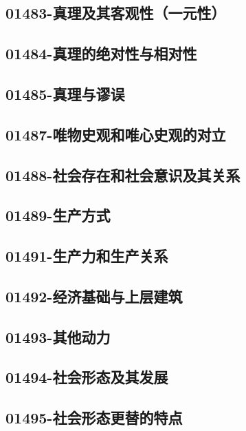 \subsection{01483-真理及其客观性（一元性）}

\subsection{01484-真理的绝对性与相对性}

\subsection{01485-真理与谬误}

\subsection{01487-唯物史观和唯心史观的对立}

\subsection{01488-社会存在和社会意识及其关系}

\subsection{01489-生产方式}

\subsection{01491-生产力和生产关系}

\subsection{01492-经济基础与上层建筑}

\subsection{01493-其他动力}

\subsection{01494-社会形态及其发展}

\subsection{01495-社会形态更替的特点}

